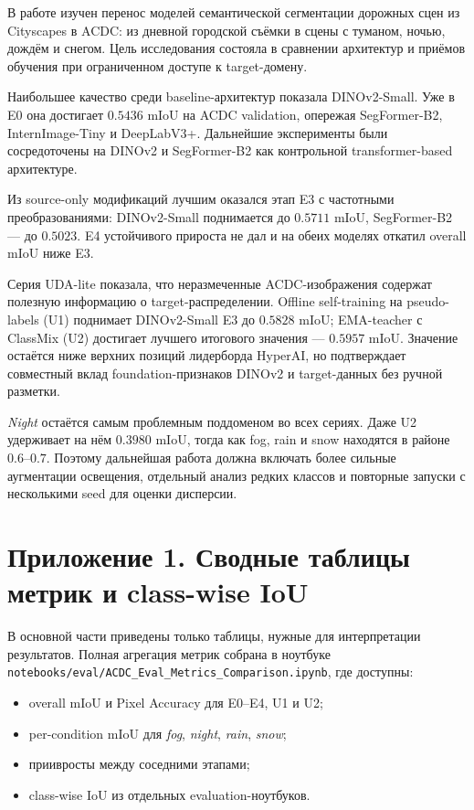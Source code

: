\documentclass[14pt,a4paper]{extarticle}
\begin{document}
В работе изучен перенос моделей семантической сегментации дорожных сцен из Cityscapes в ACDC: из дневной городской съёмки в сцены с туманом, ночью, дождём и снегом. Цель исследования состояла в сравнении архитектур и приёмов обучения при ограниченном доступе к target-домену.

Наибольшее качество среди baseline-архитектур показала DINOv2-Small. Уже в E0 она достигает $0.5436$ mIoU на ACDC validation, опережая SegFormer-B2, InternImage-Tiny и DeepLabV3+. Дальнейшие эксперименты были сосредоточены на DINOv2 и SegFormer-B2 как контрольной transformer-based архитектуре.

Из source-only модификаций лучшим оказался этап E3 с частотными преобразованиями: DINOv2-Small поднимается до $0.5711$ mIoU, SegFormer-B2 --- до $0.5023$. E4 устойчивого прироста не дал и на обеих моделях откатил overall mIoU ниже E3.

Серия UDA-lite показала, что неразмеченные ACDC-изображения содержат полезную информацию о target-распределении. Offline self-training на pseudo-labels (U1) поднимает DINOv2-Small E3 до $0.5828$ mIoU; EMA-teacher с ClassMix (U2) достигает лучшего итогового значения --- $\mathbf{0.5957}$ mIoU. Значение остаётся ниже верхних позиций лидерборда HyperAI, но подтверждает совместный вклад foundation-признаков DINOv2 и target-данных без ручной разметки.

\textit{Night} остаётся самым проблемным поддоменом во всех сериях. Даже U2 удерживает на нём $0.3980$ mIoU, тогда как fog, rain и snow находятся в районе $0.6$--$0.7$. Поэтому дальнейшая работа должна включать более сильные аугментации освещения, отдельный анализ редких классов и повторные запуски с несколькими seed для оценки дисперсии.

\newpage
\printbibliography[heading=bibintoc, title={Список использованной литературы}]

\newpage

\section*{Приложение 1. Сводные таблицы метрик и class-wise IoU}

В основной части приведены только таблицы, нужные для интерпретации результатов. Полная агрегация метрик собрана в ноутбуке \texttt{notebooks/eval/ACDC\_Eval\_Metrics\_Comparison.ipynb}, где доступны:
\begin{itemize}
    \item overall mIoU и Pixel Accuracy для E0--E4, U1 и U2;
    \item per-condition mIoU для \textit{fog}, \textit{night}, \textit{rain}, \textit{snow};
    \item приивросты между соседними этапами;
    \item class-wise IoU из отдельных evaluation-ноутбуков.
\end{itemize}
\end{document}
